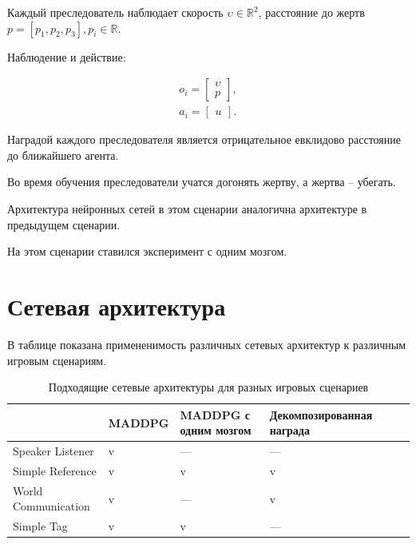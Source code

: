Каждый преследователь наблюдает скорость $\upsilon \in \mathbb{R}^2$, расстояние до жертв ${p = [p_1, p_2, p_3], p_i \in \mathbb{R}}$.

Наблюдение и действие:

\begin{equation}
    \begin{multlined}
        o_i = \begin{bmatrix}
                  \upsilon \\ p
        \end{bmatrix}, \\
        a_i = \begin{bmatrix}
                  u
        \end{bmatrix}.
    \end{multlined}
\end{equation}

Наградой каждого преследователя является отрицательное евклидово расстояние до ближайшего агента.

Во время обучения преследователи учатся догонять жертву, а жертва – убегать.

Архитектура нейронных сетей в этом сценарии аналогична архитектуре в предыдущем сценарии.

На этом сценарии ставился эксперимент с одним мозгом.


\section{Сетевая архитектура} \label{network-architecture}

В таблице  показана примененимость различных сетевых архитектур к различным игровым сценариям.

\begin{table}[t!]
    \centering\small
    \caption{Подходящие сетевые архитектуры для разных игровых сценариев}
    \label{tab-algs-application}
    \begin{tabular}{|l|l|l|l|l|l|}
        \hline
        & MADDPG & MADDPG с одним мозгом & Декомпозированная награда \\
        \hline
        Speaker Listener    & v      & ---                   & ---                       \\ \hline
        Simple Reference    & v      & v                     & v                         \\ \hline
        World Communication & v      & ---                   & v                         \\ \hline
        Simple Tag          & v      & v                     & ---                       \\ \hline
    \end{tabular}
    \normalsize%
\end{table}

